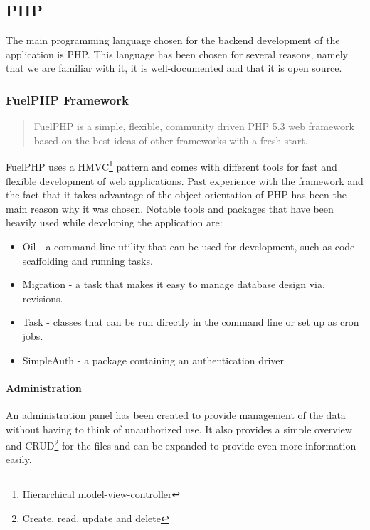 \subsection{PHP}

The main programming language chosen for the backend development of the application is PHP. This language has been chosen for several reasons, namely that we are familiar with it, it is well-documented and that it is open source.

\subsubsection{FuelPHP Framework}

\begin{quote}
FuelPHP is a simple, flexible, community driven PHP 5.3 web framework based on the best ideas of other frameworks with a fresh start\cite{FuelPHP}.
\end{quote}

FuelPHP uses a HMVC\footnote{Hierarchical model-view-controller} pattern and comes with different tools for fast and flexible development of web applications. Past experience with the framework and the fact that it takes advantage of the object orientation of PHP has been the main reason why it was chosen. Notable tools and packages that have been heavily used while developing the application are:

\begin{itemize}
\item Oil - a command line utility that can be used for development, such as code scaffolding and running tasks. 
\item Migration - a task that makes it easy to manage database design via. revisions.
\item Task - classes that can be run directly in the command line or set up as cron jobs.
\item SimpleAuth - a package containing an authentication driver
\end{itemize}

\paragraph{Administration}

An administration panel has been created to provide management of the data without having to think of unauthorized use. It also provides a simple overview and CRUD\footnote{Create, read, update and delete} for the \textsf{files} and can be expanded to provide even more information easily.

